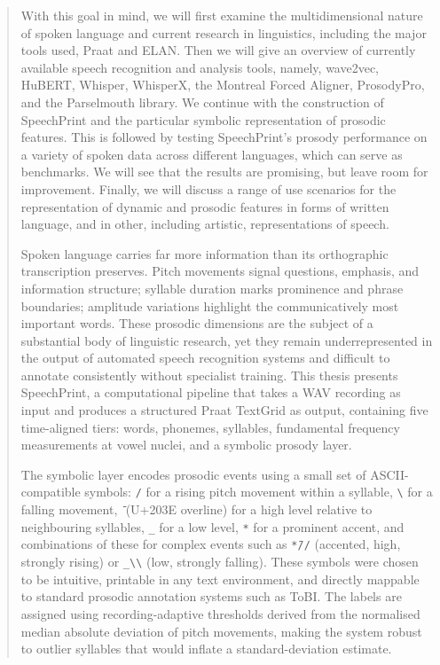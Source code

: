 \begin{abstract}
With this goal in mind, we will first examine the multidimensional nature of spoken language and current research in linguistics, including the major tools used, Praat and ELAN. Then we will give an overview of currently available speech recognition and analysis tools, namely, wave2vec, HuBERT, Whisper, WhisperX, the Montreal Forced Aligner, ProsodyPro, and the Parselmouth library. We continue with the construction of SpeechPrint and the particular symbolic representation of prosodic features. This is followed by testing SpeechPrint's prosody performance on a variety of spoken data across different languages, which can serve as benchmarks. We will see that the results are promising, but leave room for improvement. Finally, we will discuss a range of use scenarios for the representation of dynamic and prosodic features in forms of written language, and in other, including artistic, representations of speech.


Spoken language carries far more information than its orthographic transcription preserves. Pitch movements signal questions, emphasis, and information structure; syllable duration marks prominence and phrase boundaries; amplitude variations highlight the communicatively most important words. These prosodic dimensions are the subject of a substantial body of linguistic research, yet they remain underrepresented in the output of automated speech recognition systems and difficult to annotate consistently without specialist training. This thesis presents SpeechPrint, a computational pipeline that takes a WAV recording as input and produces a structured Praat TextGrid as output, containing five time-aligned tiers: words, phonemes, syllables, fundamental frequency measurements at vowel nuclei, and a symbolic prosody layer.

The symbolic layer encodes prosodic events using a small set of ASCII-compatible symbols: \texttt{/} for a rising pitch movement within a syllable, \texttt{\textbackslash} for a falling movement, \texttt{{\={}}} (U+203E overline) for a high level relative to neighbouring syllables, \texttt{\_} for a low level, \texttt{*} for a prominent accent, and combinations of these for complex events such as \texttt{*{\={}}//} (accented, high, strongly rising) or \texttt{\_\textbackslash\textbackslash} (low, strongly falling). These symbols were chosen to be intuitive, printable in any text environment, and directly mappable to standard prosodic annotation systems such as ToBI. The labels are assigned using recording-adaptive thresholds derived from the normalised median absolute deviation of pitch movements, making the system robust to outlier syllables that would inflate a standard-deviation estimate.


\end{abstract}
